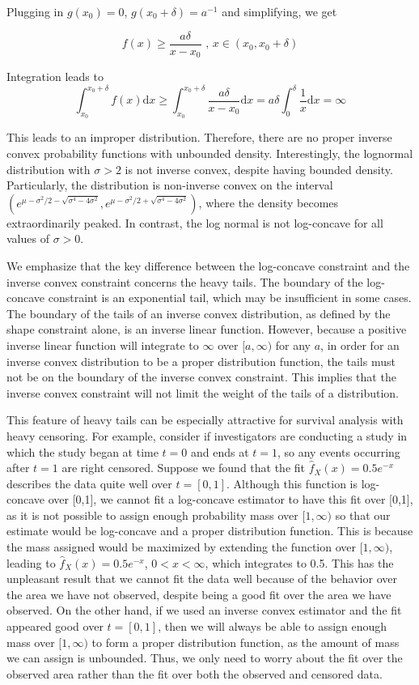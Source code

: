 \documentclass[11pt]{article}
\numberwithin{equation}{section}
\begin{document}
	Plugging in $g(x_0) = 0$, $g(x_0 + \delta) = a^{-1}$ and simplifying, we get 
		
	\[
	f(x) \geq \frac{a \delta}{x - x_0}  \text{ , } x \in (x_0, x_0 + \delta)
	\]	
		
	Integration leads to 	
		\[
		\displaystyle \int_{x_0}^{x_0 + \delta} f(x) \mathrm{d}x \geq  \displaystyle \int_{x_0}^{x_0 + \delta} \frac{a \delta}{x - x_0} \mathrm{d}x
		 = a \delta \displaystyle  \int_0^{\delta} \frac{1} {x} \mathrm{d}x = \infty
		\]
		
	This leads to an improper distribution. Therefore, there are no proper inverse convex probability functions with unbounded density. Interestingly, the lognormal distribution with $\sigma > 2$ is not inverse convex, despite having bounded density. Particularly, the distribution is non-inverse convex on the interval $(e^{\mu - \sigma^2/2 - \sqrt{\sigma^4 - 4\sigma^2} } , e^{\mu - \sigma^2/2 + \sqrt{\sigma^4 - 4\sigma^2}} )$, where the density becomes extraordinarily peaked. In contrast, the log normal is not log-concave for all values of $\sigma > 0$. 
	
	We emphasize that the key difference between the log-concave constraint and the inverse convex constraint concerns the heavy tails. The boundary of the log-concave constraint is an exponential tail, which may be insufficient in some cases. The boundary of the tails of an inverse convex distribution, as defined by the shape constraint alone, is an inverse linear function. However, because a positive inverse linear function will integrate to $\infty$ over $[a, \infty)$ for any $a$, in order for an inverse convex distribution to be a proper distribution function, the tails must not be on the boundary of the inverse convex constraint. This implies that the inverse convex constraint will not limit the weight of the tails of a distribution. 
	
		This feature of heavy tails can be especially attractive for survival analysis with heavy censoring. For example, consider if investigators are conducting a study in which the study began at time $t = 0$ and ends at $t = 1$, so any events occurring after $t = 1$ are right censored. Suppose we found that the fit $\hat f_X(x) = 0.5 e^{-x}$ describes the data quite well over $t = [0,1]$. Although this function is log-concave over [0,1], we cannot fit a log-concave estimator to have this fit over [0,1], as it is not possible to assign enough probability mass over $[1, \infty)$ so that our estimate would be log-concave and a proper distribution function. This is because the mass assigned would be maximized by extending the function over $[1, \infty)$, leading to $\hat f_X(x) = 0.5 e^{-x}$, $0 < x < \infty$, which integrates to 0.5. This has the unpleasant result that we cannot fit the data well because of the behavior over the area we have not observed, despite being a good fit over the area we have observed. On the other hand, if we used an inverse convex estimator and the fit appeared good over $t = [0,1]$, then we will always be able to assign enough mass over $[1, \infty)$ to form a proper distribution function, as the amount of mass we can assign is unbounded. Thus, we only need to worry about the fit over the observed area rather than the fit over both the observed and censored data. 
\end{document}
